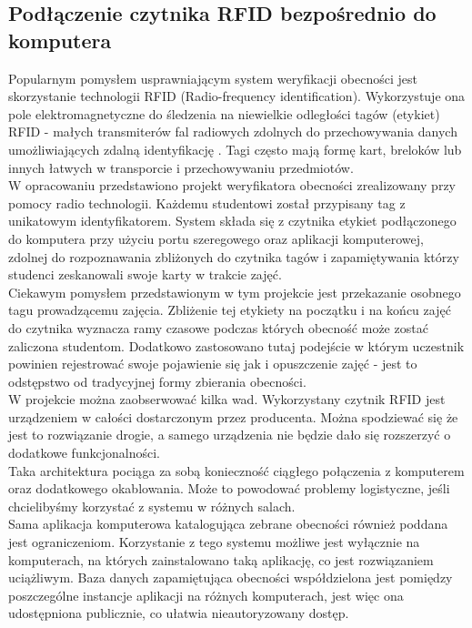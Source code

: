 \documentclass[declaration,shortabstract, mgr]{iithesis}
\begin{document}
\subsection{Podłączenie czytnika RFID bezpośrednio do komputera}
\indent Popularnym pomysłem usprawniającym system weryfikacji obecności jest skorzystanie technologii RFID (Radio-frequency identification). Wykorzystuje ona pole elektromagnetyczne do śledzenia na niewielkie odległości tagów (etykiet) RFID - małych transmiterów fal radiowych zdolnych do przechowywania danych umożliwiających zdalną identyfikację \cite{rfid_itself}. Tagi często mają formę kart, breloków lub innych łatwych w transporcie i przechowywaniu przedmiotów.\\
\indent W opracowaniu \cite{rfid_serial} przedstawiono projekt weryfikatora obecności zrealizowany przy pomocy radio technologii. Każdemu studentowi został przypisany tag z unikatowym identyfikatorem. System składa się z czytnika etykiet podłączonego do komputera przy użyciu portu szeregowego oraz aplikacji komputerowej, zdolnej do rozpoznawania zbliżonych do czytnika tagów i zapamiętywania którzy studenci zeskanowali swoje karty w trakcie zajęć. \\
\indent Ciekawym pomysłem przedstawionym w tym projekcie jest przekazanie osobnego tagu prowadzącemu zajęcia. Zbliżenie tej etykiety na początku i na końcu zajęć do czytnika wyznacza ramy czasowe podczas których obecność może zostać zaliczona studentom. Dodatkowo zastosowano tutaj podejście w którym uczestnik powinien rejestrować swoje pojawienie się jak i opuszczenie zajęć - jest to odstępstwo od tradycyjnej formy zbierania obecności. \\
\indent W projekcie można zaobserwować kilka wad. Wykorzystany czytnik RFID jest urządzeniem w całości dostarczonym przez producenta. Można spodziewać się że jest to rozwiązanie drogie, a samego urządzenia nie będzie dało się rozszerzyć o dodatkowe funkcjonalności. \\
\indent Taka architektura pociąga za sobą konieczność ciągłego połączenia z komputerem oraz dodatkowego okablowania. Może to powodować problemy logistyczne, jeśli chcielibyśmy korzystać z systemu w różnych salach.\\
\indent Sama aplikacja komputerowa katalogująca zebrane obecności również poddana jest ograniczeniom. Korzystanie z tego systemu możliwe jest wyłącznie na komputerach, na których zainstalowano taką aplikację, co jest rozwiązaniem uciążliwym. Baza danych zapamiętująca obecności współdzielona jest pomiędzy poszczególne instancje aplikacji na różnych komputerach, jest więc ona udostępniona publicznie, co ułatwia nieautoryzowany dostęp.
\end{document}
